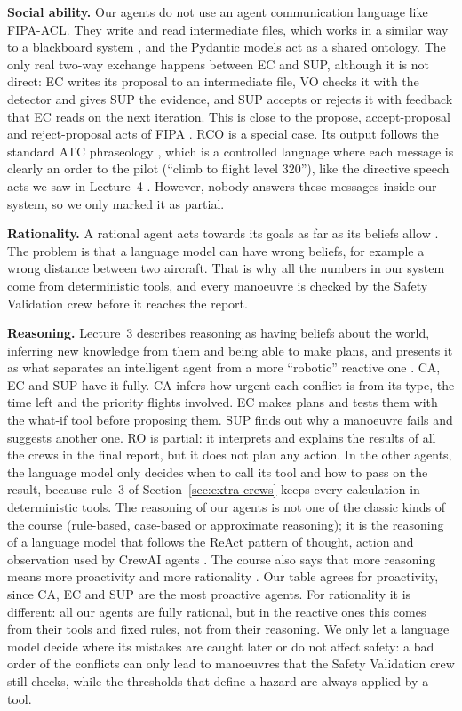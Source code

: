 \textbf{Social ability.} Our agents do not use an agent communication language like
FIPA-ACL. They write and read intermediate files, which works in a similar way to a
blackboard system \cite{lecture4}, and the Pydantic models act as a shared ontology. The
only real two-way exchange happens between EC and SUP, although it is not direct: EC
writes its proposal to an intermediate file, VO checks it with the detector and gives SUP
the evidence, and SUP accepts or rejects it with feedback that EC reads on the next
iteration. This is close to the propose, accept-proposal and reject-proposal acts of FIPA
\cite{fipa_acl}. RCO is a special case. Its output follows the standard ATC
phraseology \cite{icao_doc9432}, which is a controlled language where each message is
clearly an order to the pilot (``climb to flight level 320''), like the directive speech
acts we saw in Lecture~4 \cite{lecture4}. However, nobody answers these messages inside our system, so we
only marked it as partial.

\textbf{Rationality.} A rational agent acts towards its goals as far as its beliefs allow
\cite{lecture3}. The problem is that a language model can have wrong beliefs, for example a
wrong distance between two aircraft. That is why all the numbers in our system come from
deterministic tools, and every manoeuvre is checked by the Safety Validation crew before
it reaches the report.

\textbf{Reasoning.} Lecture~3 describes reasoning as having beliefs about the world,
inferring new knowledge from them and being able to make plans, and presents it as what
separates an intelligent agent from a more ``robotic'' reactive one \cite{lecture3}. CA, EC
and SUP have it fully. CA infers how urgent each conflict is from its type, the time left
and the priority flights involved. EC makes plans and tests them with the what-if tool
before proposing them. SUP finds out why a manoeuvre fails and suggests another one. RO is partial: it interprets
and explains the results of all the crews in the final report, but it does not plan any
action. In the other agents, the language model only decides when to call its tool and
how to pass on the result, because rule~3 of Section~\ref{sec:extra-crews} keeps every
calculation in deterministic tools. The reasoning of our agents is not one of the classic
kinds of the course (rule-based, case-based or approximate reasoning); it is the reasoning
of a language model that follows the ReAct pattern of thought, action and observation
used by CrewAI agents \cite{yao2023react}. The course also says that more reasoning means more proactivity and
more rationality \cite{lecture3}. Our table agrees for proactivity, since CA, EC and SUP are
the most proactive agents. For rationality it is different: all our agents are fully
rational, but in the reactive ones this comes from their tools and fixed rules, not from
their reasoning. We only let a language model decide where its mistakes are caught later or
do not affect safety: a bad order of the conflicts can only lead to manoeuvres that the
Safety Validation crew still checks, while the thresholds that define a hazard are always
applied by a tool.

